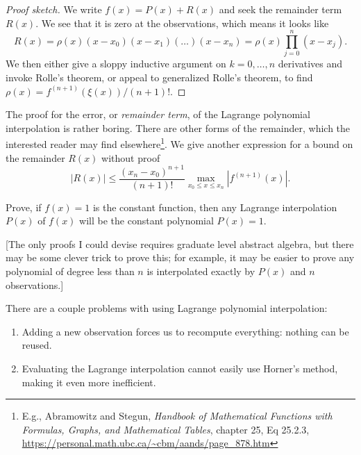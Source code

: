 \begin{proof}[Proof sketch]
We write $f(x) = P(x) + R(x)$ and seek the remainder term $R(x)$. We see
that it is zero at the observations, which means it looks like
\begin{equation}
  R(x) = \rho(x)(x-x_{0})(x-x_{1})(\dots)(x-x_{n})=\rho(x)\prod^{n}_{j=0}(x-x_{j}).
\end{equation}
We then either give a sloppy inductive argument on $k=0,\dots,n$ derivatives
and invoke Rolle's theorem, or appeal to generalized Rolle's theorem, to
find $\rho(x) = f^{(n+1)}(\xi(x))/(n+1)!$.
\end{proof}

\begin{rmk}
  The proof for the error, or \emph{remainder term}, of the Lagrange
  polynomial interpolation is rather boring. There are other forms of
  the remainder, which the interested reader may find
  elsewhere\footnote{E.g., Abramowitz and Stegun, \emph{Handbook of Mathematical Functions with Formulas, Graphs, and Mathematical Tables},
  chapter 25, Eq 25.2.3, \url{https://personal.math.ubc.ca/~cbm/aands/page_878.htm}}.
  We give another expression for a bound on the remainder $R(x)$ without proof
  \begin{equation}
    |R(x)|\leq\frac{(x_{n}-x_{0})^{n+1}}{(n+1)!}\max_{x_{0}\leq x\leq x_{n}}|f^{(n+1)}(x)|.
  \end{equation}
\end{rmk}

\begin{xca}\label{xca:interpolation:lagrange:one}
  Prove, if $f(x)=1$ is the constant function, then any Lagrange
  interpolation $P(x)$ of $f(x)$ will be the constant polynomial
  $P(x)=1$.
  
  [The only proofs I could devise requires graduate level abstract
    algebra, but there may be some clever trick to prove this; for
    example, it may be easier to prove any polynomial of degree less
    than $n$ is interpolated exactly by $P(x)$ and $n$ observations.]
\end{xca}

\begin{problem}
  There are a couple problems with using Lagrange polynomial
  interpolation:
  \begin{enumerate}
  \item Adding a new observation forces us to recompute everything:
    nothing can be reused.
  \item Evaluating the Lagrange interpolation cannot easily use Horner's
    method, making it even more inefficient.
  \end{enumerate}
\end{problem}

